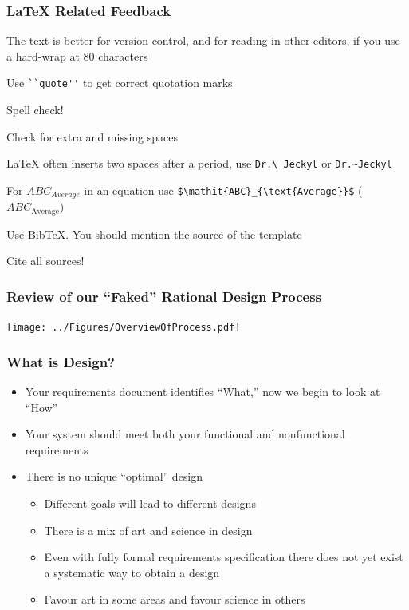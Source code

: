 \documentclass[t,12pt,numbers,fleqn]{beamer}
\begin{document}

\begin{frame}[fragile]
\frametitle{LaTeX Related Feedback}
\bi
\item The text is better for version control, and for reading in other editors,
  if you use a hard-wrap at 80 characters
\item Use \verb|``quote''| to get correct quotation marks
\item Spell check!
\item Check for extra and missing spaces
\item LaTeX often inserts two spaces after a period, use \verb|Dr.\ Jeckyl| or
  \verb|Dr.~Jeckyl|
\item For $ABC_{Average}$ in an equation use
  \verb|$\mathit{ABC}_{\text{Average}}$| ($\mathit{ABC}_{\text{Average}}$)
\item Use BibTeX.  You should mention the source of the
  template~\cite{SmithAndLai2005, SmithEtAl2007} 
\item Cite all sources!
\ei
\end{frame}


\begin{frame}

\frametitle{Review of our ``Faked'' Rational Design Process}

\begin{center}
\texttt{[image: ../Figures/OverviewOfProcess.pdf]}
\end{center}

\end{frame}


\begin{frame}
\frametitle{What is Design?}
\begin{itemize}
\item Your requirements document identifies ``What,'' now we begin to look at ``How''
\item Your system should meet both your functional and nonfunctional requirements
\item There is no unique ``optimal'' design
\begin{itemize}
\item Different goals will lead to different designs
\item There is a mix of art and science in design
\item Even with fully formal requirements specification there does not yet exist a systematic way to obtain a design
\item Favour art in some areas and favour science in others
\end{itemize}
\end{itemize}
\end{frame}
\end{document}
